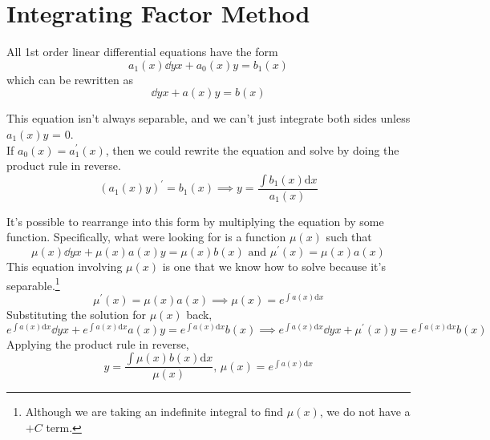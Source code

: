 \section{Integrating Factor Method}
All 1st order linear differential equations have the form
\begin{equation*}
	a_1(x)\dd{y}{x} + a_0(x)y = b_1(x)
\end{equation*}
which can be rewritten as
\begin{equation*}
	\dd{y}{x} + a(x)y = b(x)
\end{equation*}

\noindent
This equation isn't always separable, and we can't just integrate both sides unless $a_1(x)y$ = 0.\\

\noindent
If $a_0(x) = a_1^\prime(x)$, then we could rewrite the equation and solve by doing the product rule in reverse.
\begin{equation*}
	\left(a_1(x)y\right)^\prime = b_1(x) \implies y = \frac{\int{b_1(x) \mathrm{d}x}}{a_1(x)}
\end{equation*}

\noindent
It's possible to rearrange into this form by multiplying the equation by some function. Specifically, what were looking for is a function $\mu(x)$ such that
\begin{equation*}
	\mu(x)\dd{y}{x} + \mu(x)a(x)y = \mu(x)b(x) \text{ and } \mu^\prime(x) = \mu(x)a(x)
\end{equation*}
This equation involving $\mu(x)$ is one that we know how to solve because it's separable.\footnote{Although we are taking an indefinite integral to find $\mu(x)$, we do not have a $+ C$ term.}
\begin{equation*}
	\mu^\prime(x) = \mu(x)a(x) \implies \mu(x) = e^{\int{a(x) \mathrm{d}x}}
\end{equation*}
Substituting the solution for $\mu(x)$ back,
\begin{equation*}
	e^{\int{a(x) \mathrm{d}x}}\dd{y}{x} + e^{\int{a(x) \mathrm{d}x}}a(x)y = e^{\int{a(x) \mathrm{d}x}}b(x) \implies e^{\int{a(x) \mathrm{d}x}}\dd{y}{x} + \mu^\prime(x)y = e^{\int{a(x) \mathrm{d}x}}b(x)
\end{equation*}
Applying the product rule in reverse,
\begin{equation*}
	y = \frac{\int{\mu(x)} b(x) \mathrm{d}x}{\mu(x)} \text{, } \mu(x) = e^{\int{a(x) \mathrm{d}x}}
\end{equation*}


\ifodd{}\fi